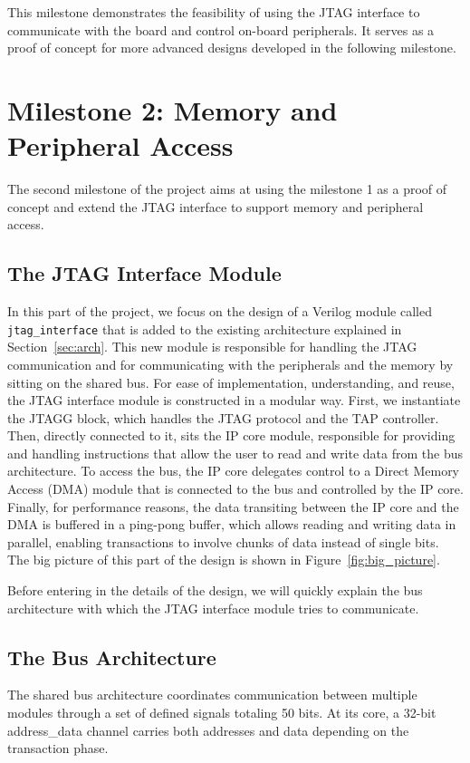 \documentclass[a4paper,11pt,oneside]{report}
\begin{document}
This milestone demonstrates the feasibility of using the JTAG interface to communicate with the board and control on-board peripherals. 
It serves as a proof of concept for more advanced designs developed in the following milestone.

\section{Milestone 2: Memory and Peripheral Access}

The second milestone of the project aims at using the milestone 1 as a proof of concept and extend the JTAG interface to support memory and peripheral access.

\subsection{The JTAG Interface Module}

In this part of the project, we focus on the design of a Verilog module called \texttt{jtag\_interface}
that is added to the existing architecture explained in Section~\ref{sec:arch}.
This new module is responsible for handling the JTAG communication and for communicating with the peripherals
and the memory by sitting on the shared bus.
For ease of implementation, understanding, and reuse, the JTAG interface module is constructed in a modular way.
First, we instantiate the JTAGG block, which handles the JTAG protocol and the TAP controller.
Then, directly connected to it, sits the IP core module, responsible for providing and handling instructions
that allow the user to read and write data from the bus architecture.
To access the bus, the IP core delegates control to a Direct Memory Access (DMA) module that is connected to the bus
and controlled by the IP core.
Finally, for performance reasons, the data transiting between the IP core and the DMA is buffered in a ping-pong buffer,
which allows reading and writing data in parallel, enabling transactions to involve chunks of data instead of single bits.
The big picture of this part of the design is shown in Figure~\ref{fig:big_picture}.

Before entering in the details of the design, we will quickly explain the bus architecture with which the JTAG interface module tries to communicate.

\subsection{The Bus Architecture}
The shared bus architecture coordinates communication between multiple modules through a set of defined signals totaling 50 bits.
At its core, a 32-bit address\_data channel carries both addresses and data depending on the transaction phase.
\end{document}
